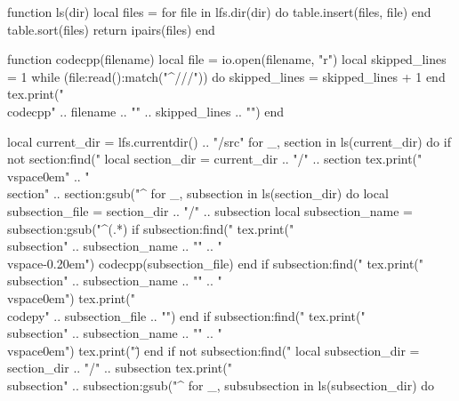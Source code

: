 \documentclass[8pt,a4paper,landscape,oneside]{amsart}
\newcommand{\codecpp}[2]{\inputminted[firstline=#2]{cpp}{'\detokenize{#1}'}}
\newcommand{\codepy}[1]{\inputminted{python}{'\detokenize{#1}'}}
\begin{document}
\begin{multicols*}{3}
\begin{tikzpicture}[every node/.style={inner sep=0pt}]
\end{tikzpicture}
\vspace{-1.6em}

\begin{luacode*}

function ls(dir)
    local files = {}
    for file in lfs.dir(dir) do
        table.insert(files, file)
    end
    table.sort(files)
    return ipairs(files)
end

function codecpp(filename)
    local file = io.open(filename, "r")
    local skipped_lines = 1
    while (file:read():match("^///")) do
        skipped_lines = skipped_lines + 1
    end
    tex.print("\\codecpp{" .. filename .. "}{" .. skipped_lines .. "}")
end

local current_dir = lfs.currentdir() .. "/src"
for _, section in ls(current_dir) do
    if not section:find("%
        local section_dir = current_dir .. "/" .. section
        tex.print("\\vspace{0em}" .. "\\section{" .. section:gsub("^%
        for _, subsection in ls(section_dir) do
            local subsection_file = section_dir .. "/" .. subsection
            local subsection_name = subsection:gsub("^(.*)%
            if subsection:find("%
                tex.print("\\subsection{" .. subsection_name .. "}" .. "\\vspace{-0.20em}")
                codecpp(subsection_file)
            end
            if subsection:find("%
                tex.print("\\subsection{" .. subsection_name .. "}" .. "\\vspace{0em}")
                tex.print("\\codepy{" .. subsection_file .. "}")
            end
            if subsection:find("%
                tex.print("\\subsection{" .. subsection_name .. "}" .. "\\vspace{0em}")
                tex.print("\")
            end
            if not subsection:find("%
                local subsection_dir = section_dir .. "/" .. subsection
                tex.print("\\subsection{" .. subsection:gsub("^%
                for _, subsubsection in ls(subsection_dir) do
}}
\end{luacode*}
\end{multicols*}
\end{document}

